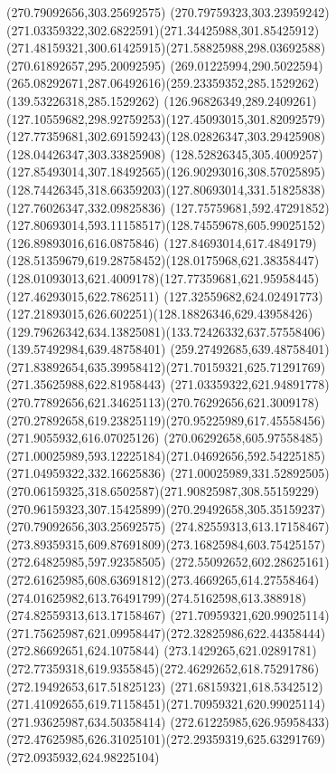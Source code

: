{{		\moveto(270.79092656,303.25692575)
		\curveto(270.79759323,303.23959242)(271.03359322,302.6822591)(271.34425988,301.85425912)
		\curveto(271.48159321,300.61425915)(271.58825988,298.03692588)(270.61892657,295.20092595)
		\curveto(269.01225994,290.5022594)(265.08292671,287.06492616)(259.23359352,285.1529262)
		\lineto(139.53226318,285.1529262)
		\curveto(126.96826349,289.2409261)(127.10559682,298.92759253)(127.45093015,301.82092579)
		\curveto(127.77359681,302.69159243)(128.02826347,303.29425908)(128.04426347,303.33825908)
		\curveto(128.52826345,305.4009257)(127.85493014,307.18492565)(126.90293016,308.57025895)
		\curveto(128.74426345,318.66359203)(127.80693014,331.51825838)(127.76026347,332.09825836)
		\lineto(127.75759681,592.47291852)
		\curveto(127.80693014,593.11158517)(128.74559678,605.99025152)(126.89893016,616.0875846)
		\curveto(127.84693014,617.4849179)(128.51359679,619.28758452)(128.0175968,621.38358447)
		\curveto(128.01093013,621.4009178)(127.77359681,621.95958445)(127.46293015,622.7862511)
		\curveto(127.32559682,624.02491773)(127.21893015,626.602251)(128.18826346,629.43958426)
		\curveto(129.79626342,634.13825081)(133.72426332,637.57558406)(139.57492984,639.48758401)
		\lineto(259.27492685,639.48758401)
		\curveto(271.83892654,635.39958412)(271.70159321,625.71291769)(271.35625988,622.81958443)
		\curveto(271.03359322,621.94891778)(270.77892656,621.34625113)(270.76292656,621.3009178)
		\curveto(270.27892658,619.23825119)(270.95225989,617.45558456)(271.9055932,616.07025126)
		\curveto(270.06292658,605.97558485)(271.00025989,593.12225184)(271.04692656,592.54225185)
		\lineto(271.04959322,332.16625836)
		\curveto(271.00025989,331.52892505)(270.06159325,318.6502587)(271.90825987,308.55159229)
		\curveto(270.96159323,307.15425899)(270.29492658,305.35159237)(270.79092656,303.25692575)
		\moveto(274.82559313,613.17158467)
		\curveto(273.89359315,609.87691809)(273.16825984,603.75425157)(272.64825985,597.92358505)
		\curveto(272.55092652,602.28625161)(272.61625985,608.63691812)(273.4669265,614.27558464)
		\curveto(274.01625982,613.76491799)(274.5162598,613.388918)(274.82559313,613.17158467)
		\moveto(271.70959321,620.99025114)
		\curveto(271.75625987,621.09958447)(272.32825986,622.44358444)(272.86692651,624.1075844)
		\lineto(273.1429265,621.02891781)
		\curveto(272.77359318,619.9355845)(272.46292652,618.75291786)(272.19492653,617.51825123)
		\curveto(271.68159321,618.5342512)(271.41092655,619.71158451)(271.70959321,620.99025114)
		\moveto(271.93625987,634.50358414)
		\lineto(272.61225985,626.95958433)
		\curveto(272.47625985,626.31025101)(272.29359319,625.63291769)(272.0935932,624.98225104)
}}
